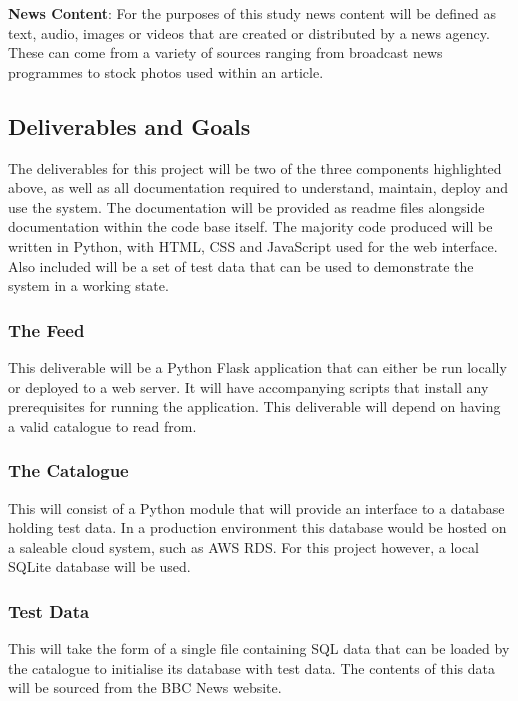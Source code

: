 \documentclass[12pt,titlepage]{article}
\begin{document}
  \textbf{News Content}: For the purposes of this study news content will be
  defined as text, audio, images or videos that are created or distributed by a
  news agency. These can come from a variety of sources ranging from broadcast
  news programmes to stock photos used within an article.

  \subsection{Deliverables and Goals}

  The deliverables for this project will be two of the three components
  highlighted above, as well as all documentation required to understand,
  maintain, deploy and use the system. The documentation will be provided as
  readme files alongside documentation within the code base itself. The majority
  code produced will be written in Python, with HTML, CSS and JavaScript used
  for the web interface. Also included will be a set of test data that can be
  used to demonstrate the system in a working state.

    \subsubsection{The Feed}

    This deliverable will be a Python Flask application that can either be run
    locally or deployed to a web server. It will have accompanying scripts that
    install any prerequisites for running the application. This deliverable
    will depend on having a valid catalogue to read from.

    \subsubsection{The Catalogue}

    This will consist of a Python module that will provide an interface to a
    database holding test data. In a production environment this database would
    be hosted on a saleable cloud system, such as AWS RDS. For this project
    however, a local SQLite database will be used.

    \subsubsection{Test Data}

    This will take the form of a single file containing SQL data that can be
    loaded by the catalogue to initialise its database with test data. The
    contents of this data will be sourced from the BBC News website.
\end{document}
